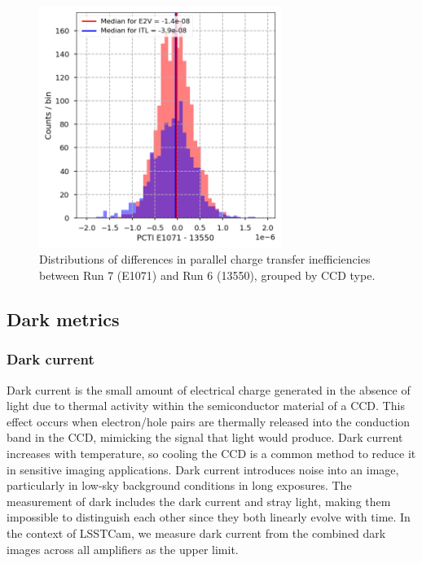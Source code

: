 \begin{figure}[ht]
\begin{centering}
\includegraphics[width=0.7\textwidth]{figures/baselineCharacterization/PCTI_13550_E1071_diff.png}
\caption{Distributions of differences in parallel charge transfer inefficiencies between Run 7 (E1071) and Run 6 (13550), grouped by CCD type.}
\label{fig:parallel-cti-dist}
\end{centering}
\end{figure}

\clearpage
\subsection{Dark metrics}\label{dark-metrics}

\subsubsection{Dark current}\label{dark-current}

Dark current is the small amount of electrical charge generated in the
absence of light due to thermal activity within the semiconductor
material of a CCD. This effect occurs when electron/hole pairs are thermally released
into the conduction band in the CCD, mimicking the signal that light would
produce. Dark current increases with temperature, so cooling the CCD is
a common method to reduce it in sensitive imaging applications. Dark
current introduces noise into an image, particularly in low-sky background conditions in long exposures.
The measurement of dark includes the dark current and stray light, making them impossible to distinguish each other since they both linearly evolve with time.
In the context
of LSSTCam, we measure dark current from the combined dark images across
all amplifiers as the upper limit.

